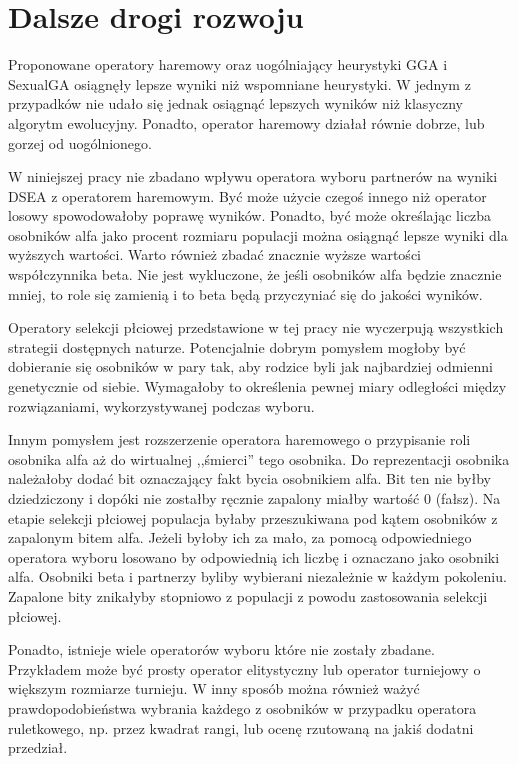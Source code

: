 \documentclass[./FM_mgr.tex]{subfiles}
\begin{document}
\chapter{Dalsze drogi rozwoju}

Proponowane operatory haremowy oraz uogólniający heurystyki GGA i SexualGA osiągnęły lepsze wyniki niż wspomniane heurystyki.
W jednym z przypadków nie udało się jednak osiągnąć lepszych wyników niż klasyczny algorytm ewolucyjny.
Ponadto, operator haremowy działał równie dobrze, lub gorzej od uogólnionego.

W niniejszej pracy nie zbadano wpływu operatora wyboru partnerów na wyniki DSEA z operatorem haremowym.
Być może użycie czegoś innego niż operator losowy spowodowałoby poprawę wyników.
Ponadto, być może określając liczba osobników alfa jako procent rozmiaru populacji można osiągnąć lepsze wyniki dla wyższych wartości.
Warto również zbadać znacznie wyższe wartości współczynnika beta.
Nie jest wykluczone, że jeśli osobników alfa będzie znacznie mniej, to role się zamienią i to beta będą przyczyniać się do jakości wyników.

Operatory selekcji płciowej przedstawione w tej pracy nie wyczerpują wszystkich strategii dostępnych naturze.
Potencjalnie dobrym pomysłem mogłoby być dobieranie się osobników w pary tak, aby rodzice byli jak najbardziej odmienni genetycznie od siebie.
Wymagałoby to określenia pewnej miary odległości między rozwiązaniami, wykorzystywanej podczas wyboru.

Innym pomysłem jest rozszerzenie operatora haremowego o przypisanie roli osobnika alfa aż do wirtualnej ,,śmierci'' tego osobnika.
Do reprezentacji osobnika należałoby dodać bit oznaczający fakt bycia osobnikiem alfa.
Bit ten nie byłby dziedziczony i dopóki nie zostałby ręcznie zapalony miałby wartość 0 (fałsz).
Na etapie selekcji płciowej populacja byłaby przeszukiwana pod kątem osobników z zapalonym bitem alfa.
Jeżeli byłoby ich za mało, za pomocą odpowiedniego operatora wyboru losowano by odpowiednią ich liczbę i oznaczano jako osobniki alfa.
Osobniki beta i partnerzy byliby wybierani niezależnie w każdym pokoleniu.
Zapalone bity znikałyby stopniowo z populacji z powodu zastosowania selekcji płciowej.

Ponadto, istnieje wiele operatorów wyboru które nie zostały zbadane.
Przykładem może być prosty operator elitystyczny lub operator turniejowy o większym rozmiarze turnieju.
W inny sposób można również ważyć prawdopodobieństwa wybrania każdego z osobników w przypadku operatora ruletkowego, np. przez kwadrat rangi, lub ocenę rzutowaną na jakiś dodatni przedział.
\end{document}
